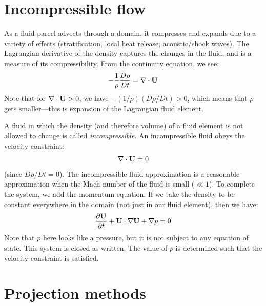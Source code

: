 \label{ch:incompressible}

\section{Incompressible flow}

As a fluid parcel advects through a domain, it compresses and expands
due to a variety of effects (stratification, local heat release,
acoustic/shock waves).  The Lagrangian derivative of the density
captures the changes in the fluid, and is a measure of its compressibility.
From the continuity equation, we see:
\begin{equation}
-\frac{1}{\rho}\frac{D\rho}{Dt} = \nabla \cdot {\bf U}
\end{equation}
Note that for $\nabla \cdot {\bf U} > 0$, we have $-(1/\rho) (D\rho/Dt) > 0$,
which means that $\rho$ gets smaller---this is expansion of the Lagrangian
fluid element.

A fluid in which the density (and therefore volume) of a fluid element is not
allowed to change is called {\em incompressible}.  An incompressible
fluid obeys the velocity constraint:
\begin{equation}
\nabla \cdot {\bf U} = 0
\end{equation}
(since $D\rho / Dt = 0$).  The incompressible fluid approximation is 
a reasonable approximation when the Mach number of the fluid is small
($\ll 1$).  To complete the system, we add the momentum equation.  If 
we take the density to be constant everywhere in the domain (not just
in our fluid element), then we have:
\begin{equation}
\frac{\partial {\bf U}}{\partial t} + {\bf U} \cdot \nabla {\bf U} + \nabla p = 0
\end{equation}
Note that $p$ here looks like a pressure, but it is not subject to
any equation of state.  This system is closed as written.  The value
of $p$ is determined such that the velocity constraint is satisfied.



\section{Projection methods}

